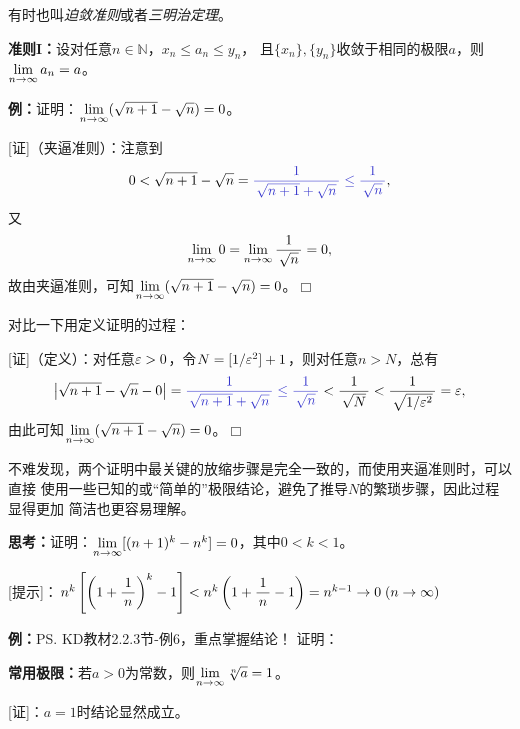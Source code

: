 有时也叫{\it 迫敛准则}或者{\it 三明治定理}。

\begin{thx}
	{\bf 准则I：}设对任意$n\in\mathbb{N}$，$x_n\le a_n\le y_n$，
	且$\{x_n\},\{y_n\}$收敛于相同的极限$a$，则$\lim\limits_{n\to\infty} a_n=a$。
\end{thx}

\begin{center}
\end{center}

{\bf 例：}证明：$\lim\limits_{n\to\infty} (\sqrt{n+1}-\sqrt{n})=0$。

[证]（夹逼准则）：注意到
$$0<\sqrt{n+1}-\sqrt{n}={\b\df1{\sqrt{n+1}+\sqrt{n}}
\leq\df 1{\sqrt{n}}},$$
又
$$\lim\limits_{n\to\infty} 0=\lim\limits_{n\to\infty}\displaystyle\frac{\,{1}\,}{\,{\sqrt{n}}\,}=0,$$
故由夹逼准则，可知$\lim\limits_{n\to\infty} (\sqrt{n+1}-\sqrt{n})=0$。\hfill $\Box$

对比一下用定义证明的过程：

[证]（定义）：对任意$\varepsilon>0$，令$N=[1/\varepsilon^2]+1$，则对任意$n>N$，总有
$$\left|\sqrt{n+1}-\sqrt{n}-0\right|
={\b\df1{\sqrt{n+1}+\sqrt{n}}\leq\df 1{\sqrt{n}}}
<\df 1{\sqrt{N}}<\df 1{\sqrt{1/\e^2}}=\e,$$
由此可知$\lim\limits_{n\to\infty} (\sqrt{n+1}-\sqrt{n})=0$。\hfill $\Box$

不难发现，两个证明中最关键的放缩步骤是完全一致的，而使用夹逼准则时，可以直接
使用一些已知的或“简单的”极限结论，避免了推导$N$的繁琐步骤，因此过程显得更加
简洁也更容易理解。

{\bf 思考：}证明：$\lim\limits_{n\to\infty} [(n+1)^k-{n}^k]=0$，其中$0<k<1$。

[提示]：$n^k\left[\left(1+\displaystyle\frac{\,{1}\,}{\,{n}\,}\right)^k-1\right]
<n^k\left(1+\displaystyle\frac{\,{1}\,}{\,{n}\,}-1\right)=n^{k-1}\to 0\;(n\to\infty)$

{\bf 例：}\ps{KD教材2.2.3节-例6，重点掌握结论！}
证明：
\begin{thx}
	{\bf 常用极限：}若$a>0$为常数，则$\lim\limits_{n\to\infty} \sqrt[n]{a}=1$。
\end{thx}
[证]：$a=1$时结论显然成立。

